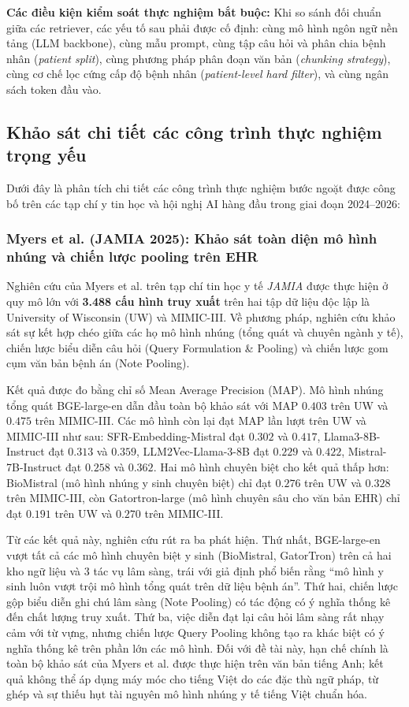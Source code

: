 \noindent\textbf{Các điều kiện kiểm soát thực nghiệm bắt buộc:} Khi so sánh đối chuẩn giữa các retriever, các yếu tố sau phải được cố định: cùng mô hình ngôn ngữ nền tảng (LLM backbone), cùng mẫu prompt, cùng tập câu hỏi và phân chia bệnh nhân (\emph{patient split}), cùng phương pháp phân đoạn văn bản (\emph{chunking strategy}), cùng cơ chế lọc cứng cấp độ bệnh nhân (\emph{patient-level hard filter}), và cùng ngân sách token đầu vào.

\subsection{Khảo sát chi tiết các công trình thực nghiệm trọng yếu}

Dưới đây là phân tích chi tiết các công trình thực nghiệm bước ngoặt được công bố trên các tạp chí y tin học và hội nghị AI hàng đầu trong giai đoạn 2024--2026:

\subsubsection{Myers et al. (JAMIA 2025): Khảo sát toàn diện mô hình nhúng và chiến lược pooling trên EHR}
Nghiên cứu của Myers et al. \cite{myers2025lessons} trên tạp chí tin học y tế \emph{JAMIA} được thực hiện ở quy mô lớn với \textbf{3.488 cấu hình truy xuất} trên hai tập dữ liệu độc lập là University of Wisconsin (UW) và MIMIC-III. Về phương pháp, nghiên cứu khảo sát sự kết hợp chéo giữa các họ mô hình nhúng (tổng quát và chuyên ngành y tế), chiến lược biểu diễn câu hỏi (Query Formulation \& Pooling) và chiến lược gom cụm văn bản bệnh án (Note Pooling).

Kết quả được đo bằng chỉ số Mean Average Precision (MAP). Mô hình nhúng tổng quát BGE-large-en dẫn đầu toàn bộ khảo sát với MAP $\mathbf{0.403}$ trên UW và $\mathbf{0.475}$ trên MIMIC-III. Các mô hình còn lại đạt MAP lần lượt trên UW và MIMIC-III như sau: SFR-Embedding-Mistral đạt $0.302$ và $0.417$, Llama3-8B-Instruct đạt $0.313$ và $0.359$, LLM2Vec-Llama-3-8B đạt $0.229$ và $0.422$, Mistral-7B-Instruct đạt $0.258$ và $0.362$. Hai mô hình chuyên biệt cho kết quả thấp hơn: BioMistral (mô hình nhúng y sinh chuyên biệt) \cite{labrak2024biomistral} chỉ đạt $0.276$ trên UW và $0.328$ trên MIMIC-III, còn Gatortron-large (mô hình chuyên sâu cho văn bản EHR) \cite{yang2022gatortron} chỉ đạt $0.191$ trên UW và $0.270$ trên MIMIC-III.

Từ các kết quả này, nghiên cứu rút ra ba phát hiện. Thứ nhất, BGE-large-en vượt tất cả các mô hình chuyên biệt y sinh (BioMistral, GatorTron) trên cả hai kho ngữ liệu và 3 tác vụ lâm sàng, trái với giả định phổ biến rằng ``mô hình y sinh luôn vượt trội mô hình tổng quát trên dữ liệu bệnh án''. Thứ hai, chiến lược gộp biểu diễn ghi chú lâm sàng (Note Pooling) có tác động có ý nghĩa thống kê đến chất lượng truy xuất. Thứ ba, việc diễn đạt lại câu hỏi lâm sàng rất nhạy cảm với từ vựng, nhưng chiến lược Query Pooling không tạo ra khác biệt có ý nghĩa thống kê trên phần lớn các mô hình. Đối với đề tài này, hạn chế chính là toàn bộ khảo sát của Myers et al. được thực hiện trên văn bản tiếng Anh; kết quả không thể áp dụng máy móc cho tiếng Việt do các đặc thù ngữ pháp, từ ghép và sự thiếu hụt tài nguyên mô hình nhúng y tế tiếng Việt chuẩn hóa.

